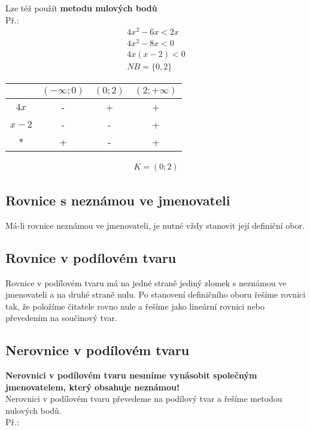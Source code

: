 \documentclass[12pt, a4paper]{article}
\begin{document}
Lze též použít \textbf{metodu nulových bodů}\\
Př.:\\
\[\begin{aligned}
4x^2 - 6x < 2x\\
4x^2 - 8x < 0\\
4x(x-2)<0\\
NB = \{0,2\}
\end{aligned}\]

\begin{center}
\begin{tabular}{| c | c | c | c |}
\hline
 & $(-\infty;0)$ & $(0;2)$ & $(2;+\infty)$\\
\hline
$4x$ & - & + & +\\
\hline
$x-2$ & - & - & +\\
\hline
$*$ & + & - & +\\
\hline
\end{tabular}
\end{center}

\[\begin{aligned}
K = (0;2)
\end{aligned}\]

\subsection*{Rovnice s neznámou ve jmenovateli}
Má-li rovnice neznámou ve jmenovateli, je nutné vždy stanovit její definiční obor.

\subsection*{Rovnice v podílovém tvaru}
Rovnice v podílovém tvaru má na jedné straně jediný zlomek s neznámou ve jmenovateli a na druhé straně nulu. Po stanovení definičního oboru řešíme rovnici tak,
že položíme čitatele rovno nule a řešíme jako lineární rovnici nebo převedením na součinový tvar.

\pagebreak

\subsection*{Nerovnice v podílovém tvaru}
\textbf{Nerovnici v podílovém tvaru nesmíme vynásobit společným jmenovatelem, který obsahuje neznámou!}\\
Nerovnici v podílovém tvaru převedeme na podílový tvar a řešíme metodou nulových bodů.\\
Př.:\\
\end{document}
